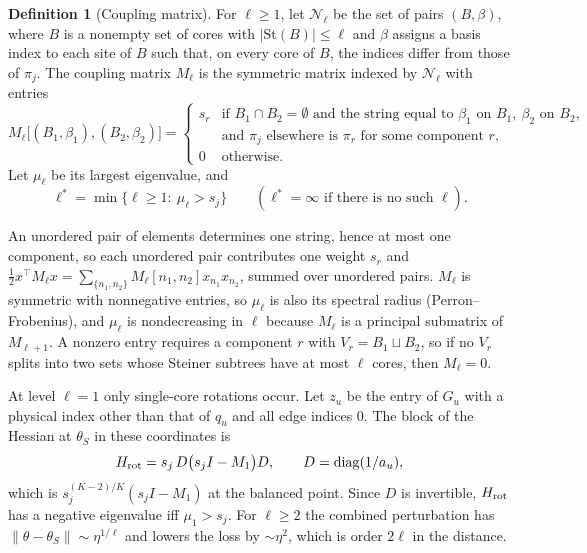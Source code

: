 \documentclass[11pt]{article}
\theoremstyle{definition}
\newtheorem{definition}{Definition}
\newcommand{\St}{\mathrm{St}}
\begin{document}
\begin{definition}[Coupling matrix]\label{def:coupling}
For $\ell\ge1$, let $\mathcal N_\ell$ be the set of pairs $(B,\beta)$, where $B$ is a nonempty set of cores with
$\lvert\St(B)\rvert\le\ell$ and $\beta$ assigns a basis index to each site of $B$ such that, on every core of $B$, the
indices differ from those of $\pi_j$. The coupling matrix $M_\ell$ is the symmetric matrix indexed by $\mathcal N_\ell$
with entries
\begin{equation}
M_\ell\big[(B_1,\beta_1),(B_2,\beta_2)\big]=\begin{cases}
s_r & \text{if }B_1\cap B_2=\emptyset\text{ and the string equal to }\beta_1\text{ on }B_1,\ \beta_2\text{ on }B_2,\\
 & \text{and }\pi_j\text{ elsewhere is }\pi_r\text{ for some component }r,\\
0 & \text{otherwise.}\end{cases}
\end{equation}
Let $\mu_\ell$ be its largest eigenvalue, and
\begin{equation}\label{eq:lstar}
\ell^*=\min\{\ell\ge1:\ \mu_\ell>s_j\}\qquad(\ell^*=\infty\text{ if there is no such }\ell).
\end{equation}
\end{definition}

An unordered pair of elements determines one string, hence at most one component, so each unordered pair contributes
one weight $s_r$ and $\frac12x^\top M_\ell x=\sum_{\{n_1,n_2\}}M_\ell[n_1,n_2]x_{n_1}x_{n_2}$, summed over unordered pairs.
$M_\ell$ is symmetric with nonnegative entries, so $\mu_\ell$ is also its spectral radius (Perron--Frobenius), and $\mu_\ell$ is
nondecreasing in $\ell$ because $M_\ell$ is a principal submatrix of $M_{\ell+1}$. A nonzero entry requires a component $r$
with $V_r=B_1\sqcup B_2$, so if no $V_r$ splits into two sets whose Steiner subtrees have at most $\ell$ cores, then
$M_\ell=0$.

At level $\ell=1$ only single-core rotations occur. Let $z_u$ be the entry of $G_u$ with a physical index other than that
of $q_u$ and all edge indices $0$. The block of the Hessian at $\theta_S$ in these coordinates is
\begin{equation}\label{eq:hessblock}
H_{\rm rot}=s_j\,D\big(s_jI-M_1\big)D,\qquad D=\mathrm{diag}(1/a_u),
\end{equation}
which is $s_j^{(K-2)/K}(s_jI-M_1)$ at the balanced point. Since $D$ is invertible, $H_{\rm rot}$ has a negative eigenvalue iff
$\mu_1>s_j$. For $\ell\ge2$ the combined perturbation has $\lVert\theta-\theta_S\rVert\sim\eta^{1/\ell}$ and lowers the loss by
$\sim\eta^2$, which is order $2\ell$ in the distance.
\end{document}
